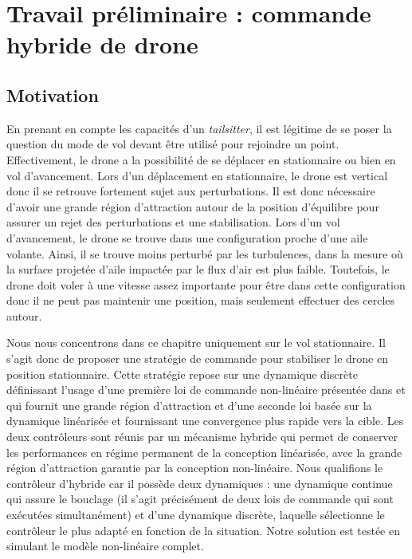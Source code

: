 \chapter{Travail préliminaire : commande hybride de drone}
\label{chap:hybrid}
\minitoc




\section{Motivation}
En prenant en compte les capacités d'un \textit{tailsitter}, il est légitime de se poser la question du mode de vol devant être utilisé pour rejoindre un point. Effectivement, le drone a la possibilité de se déplacer en stationnaire ou bien en vol d'avancement. Lors d'un déplacement en stationnaire, le drone est vertical donc il se retrouve fortement sujet aux perturbations. Il est donc nécessaire d'avoir une grande région d'attraction autour de la position d'équilibre pour assurer un rejet des perturbations et une stabilisation. Lors d'un vol d'avancement, le drone se trouve dans une configuration proche d'une aile volante. Ainsi, il se trouve moins perturbé par les turbulences, dans la mesure où la surface projetée d'aile impactée par le flux d'air est plus faible. Toutefois, le drone doit voler à une vitesse assez importante pour être dans cette configuration donc il ne peut pas maintenir une position, mais seulement effectuer des cercles autour. 

Nous nous concentrons dans ce chapitre uniquement sur le vol stationnaire. Il s'agit donc de proposer une stratégie de commande pour stabiliser le drone en position stationnaire. Cette stratégie repose sur une dynamique discrète définissant l'usage d'une première loi de commande non-linéaire présentée dans \cite{2020e-MicCenZacFra} et qui fournit une grande région d'attraction et d'une seconde loi basée sur la dynamique linéarisée et fournissant une convergence plus rapide vers la cible. Les deux contrôleurs sont réunis par un mécanisme hybride qui permet de conserver les performances en régime permanent de la conception linéarisée, avec la grande région d'attraction garantie par la conception non-linéaire.
Nous qualifions le contrôleur d'hybride car il possède deux dynamiques : une dynamique continue qui assure le bouclage (il s'agit précisément de deux lois de commande qui sont exécutées simultanément) et d'une dynamique discrète, laquelle sélectionne le contrôleur le plus adapté en fonction de la situation. Notre solution est testée en simulant le modèle non-linéaire complet.

